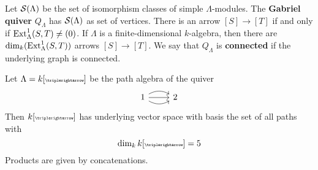 \begin{definition}
  Let $\mathcal S(\Lambda)$ be the set of isomorphism classes of simple $\Lambda$-modules. The
  \textbf{Gabriel quiver} $Q_\Lambda$ has $\mathcal S(\Lambda)$ as set of vertices. There is an arrow
  $[S] \to [T]$ if and only if $\operatorname{Ext}_\Lambda^1(S,T) \neq (0)$. If $\Lambda$ is a finite-dimensional
  $k$-algebra, then there are $\dim_k(\operatorname{Ext}_\Lambda^1(S,T))$ arrows $[S] \to [T]$. We say
  that $Q_\Lambda$ is \textbf{connected} if the underlying graph is connected.
\end{definition}


\begin{example}
  Let $\Lambda = k[{\tiny \KroneckerQuiver}]$ be the path algebra of the quiver
  \[
  \begin{tikzcd}
  1 \ar[r] \ar[r,bend right] \ar[r,bend left] & 2
  \end{tikzcd}
  \]
  Then $k[{\tiny \KroneckerQuiver}]$ has underlying vector space with basis the set of all paths with
  \[
  \dim_k k[{\tiny \KroneckerQuiver}] = 5
  \]
  Products are given by concatenations.
\end{example}

